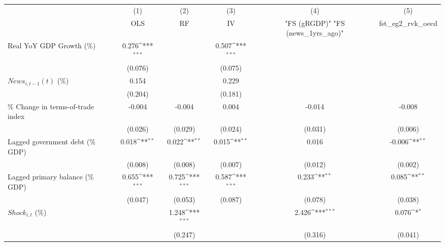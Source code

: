 {
\def\sym#1{\ifmmode^{#1}\else\(^{#1}\)\fi}
\begin{tabular}{l*{5}{c}}
\toprule
                    &\multicolumn{1}{c}{(1)}&\multicolumn{1}{c}{(2)}&\multicolumn{1}{c}{(3)}&\multicolumn{1}{c}{(4)}&\multicolumn{1}{c}{(5)}\\
                    &\multicolumn{1}{c}{OLS}&\multicolumn{1}{c}{RF}&\multicolumn{1}{c}{IV}&\multicolumn{1}{c}{ "FS (gRGDP)"  "FS (news_1yrs_ago)" }&\multicolumn{1}{c}{fst_eg2_rvk_oecd}\\
\midrule
Real YoY GDP Growth (\%)&       0.276\sym{***}&                     &       0.507\sym{***}&                     &                     \\
                    &     (0.076)         &                     &     (0.075)         &                     &                     \\
\addlinespace
$ News_{i,t-1}(t)$ (\%)&       0.154         &                     &       0.229         &                     &                     \\
                    &     (0.204)         &                     &     (0.181)         &                     &                     \\
\addlinespace
\% Change in terms-of-trade index&      -0.004         &      -0.004         &       0.004         &      -0.014         &      -0.008         \\
                    &     (0.026)         &     (0.029)         &     (0.024)         &     (0.031)         &     (0.006)         \\
\addlinespace
Lagged government debt (\% GDP)&       0.018\sym{**} &       0.022\sym{**} &       0.015\sym{**} &       0.016         &      -0.006\sym{**} \\
                    &     (0.008)         &     (0.008)         &     (0.007)         &     (0.012)         &     (0.002)         \\
\addlinespace
Lagged primary balance (\% GDP)&       0.655\sym{***}&       0.725\sym{***}&       0.587\sym{***}&       0.233\sym{**} &       0.085\sym{**} \\
                    &     (0.047)         &     (0.053)         &     (0.087)         &     (0.078)         &     (0.038)         \\
\addlinespace
$ Shock_{i,t}$ (\%) &                     &       1.248\sym{***}&                     &       2.426\sym{***}&       0.076\sym{*}  \\
                    &                     &     (0.247)         &                     &     (0.316)         &     (0.041)         \\

\end{tabular}}
